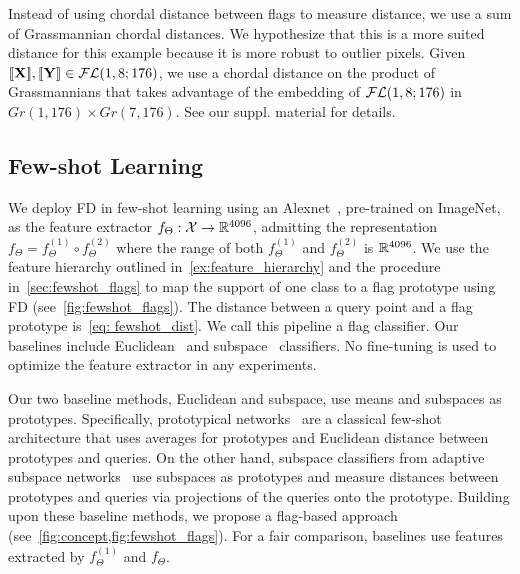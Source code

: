 Instead of using chordal distance between flags to measure distance, we use a sum of Grassmannian chordal distances.
We hypothesize that this is a more suited distance for this example because it is more robust to outlier pixels. Given $[\![\mathbf{X}]\!],[\![\mathbf{Y}]\!] \in \mathcal{FL}(1,8;176)$, we use a chordal distance on the product of Grassmannians that takes advantage of the embedding of $\mathcal{FL}(1,8;176)$ in $Gr(1,176) \times Gr(7,176)$. See our suppl. material for details.

\subsection{Few-shot Learning}\label{sec: fewshot learning}
We deploy FD in few-shot learning using an Alexnet~\cite{krizhevsky2012imagenet}, pre-trained on ImageNet, as the feature extractor $f_{\Theta}: \mathcal{X} \rightarrow \mathbb{R}^{4096}$, admitting the representation $f_{\Theta} = f_{\Theta}^{(1)} \circ f_{\Theta}^{(2)}$ where the range of both $f_{\Theta}^{(1)}$ and $f_{\Theta}^{(2)}$ is $\mathbb{R}^{4096}$. We use the feature hierarchy outlined in~\cref{ex:feature_hierarchy} and the procedure in~\cref{sec:fewshot_flags} to map the support of one class to a flag prototype using FD (see~\cref{fig:fewshot_flags}). The distance between a query point and a flag prototype is~\cref{eq: fewshot_dist}. We call this pipeline a flag classifier. Our baselines include Euclidean~\cite{snell2017prototypical} and subspace~\cite{simon2020adaptive} classifiers. No fine-tuning is used to optimize the feature extractor in any experiments.


Our two baseline methods, Euclidean and subspace, use means and subspaces as prototypes. Specifically, prototypical networks~\cite{snell2017prototypical} are a classical few-shot architecture that uses averages for prototypes and Euclidean distance between prototypes and queries. On the other hand, subspace classifiers from adaptive subspace networks~\cite{simon2020adaptive} use subspaces as prototypes and measure distances between prototypes and queries via projections of the queries onto the prototype. Building upon these baseline methods, we propose a flag-based approach (see~\cref{fig:concept,fig:fewshot_flags}). For a fair comparison, baselines use features extracted by $f^{(1)}_\Theta$ and $f_\Theta$. 

